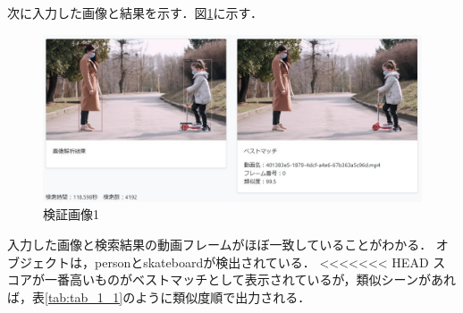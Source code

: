 \documentclass[a4j,12pt,dvipdfmx]{jreport}
\begin{document}
次に入力した画像と結果を示す．図\ref{fig:img_1-1}に示す．
\begin{figure}[b]
  \centering
  \includegraphics[width=13cm]{image/result_1_1.jpg}
  \caption{検証画像1}
  \label{fig:img_1-1}
\end{figure}

入力した画像と検索結果の動画フレームがほぼ一致していることがわかる．
オブジェクトは，personとskateboardが検出されている．
<<<<<<< HEAD
スコアが一番高いものがベストマッチとして表示されているが，類似シーンがあれば，表\ref{tab:tab_1_1}のように類似度順で出力される．
\end{document}
